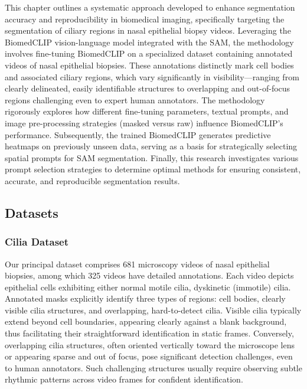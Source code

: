 \documentclass[./dissertation.tex]{subfiles}
\begin{document}
This chapter outlines a systematic approach developed to enhance segmentation accuracy and reproducibility in biomedical imaging, specifically targeting the segmentation of ciliary regions in nasal epithelial biopsy videos. Leveraging the BiomedCLIP vision-language model integrated with the SAM, the methodology involves fine-tuning BiomedCLIP on a specialized dataset containing annotated videos of nasal epithelial biopsies. These annotations distinctly mark cell bodies and associated ciliary regions, which vary significantly in visibility—ranging from clearly delineated, easily identifiable structures to overlapping and out-of-focus regions challenging even to expert human annotators. The methodology rigorously explores how different fine-tuning parameters, textual prompts, and image pre-processing strategies (masked versus raw) influence BiomedCLIP's performance. Subsequently, the trained BiomedCLIP generates predictive heatmaps on previously unseen data, serving as a basis for strategically selecting spatial prompts for SAM segmentation. Finally, this research investigates various prompt selection strategies to determine optimal methods for ensuring consistent, accurate, and reproducible segmentation results.



\subsection{Datasets}

\subsubsection{Cilia Dataset}
Our principal dataset comprises 681 microscopy videos of nasal epithelial biopsies, among which 325 videos have detailed annotations. Each video depicts epithelial cells exhibiting either normal motile cilia, dyskinetic (immotile) cilia. Annotated masks explicitly identify three types of regions: cell bodies, clearly visible cilia structures, and overlapping, hard-to-detect cilia. Visible cilia typically extend beyond cell boundaries, appearing clearly against a blank background, thus facilitating their straightforward identification in static frames. Conversely, overlapping cilia structures, often oriented vertically toward the microscope lens or appearing sparse and out of focus, pose significant detection challenges, even to human annotators. Such challenging structures usually require observing subtle rhythmic patterns across video frames for confident identification.
\end{document}
